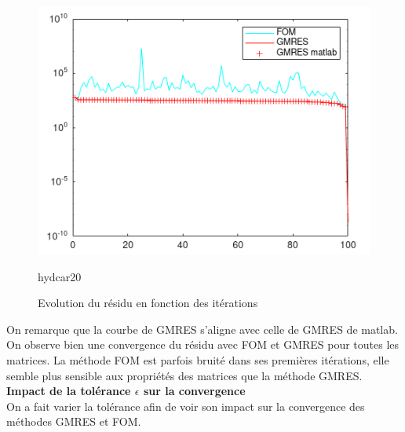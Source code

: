 \documentclass[12pt,a4paper]{article}
\begin{document}
\begin{figure}[H]
\begin{minipage}{0.45\textwidth}
        \includegraphics[width=\textwidth]{src/hyd.png}
        \caption{hydcar20}
    \end{minipage}
    \caption{Evolution du résidu en fonction des itérations}
    \label{fig:residu}
\end{figure}

On remarque que la courbe de GMRES s'aligne avec celle de GMRES de matlab.
On observe bien une convergence du résidu avec FOM et GMRES pour toutes les matrices.
La méthode FOM est parfois bruité dans ses premières itérations, elle semble plus sensible  aux propriétés des matrices que la méthode GMRES. \\


\noindent \textbf{Impact de la tolérance $\epsilon$ sur la convergence} \\
On a fait varier la tolérance afin de voir son impact sur la convergence des méthodes GMRES et FOM.
\end{document}
